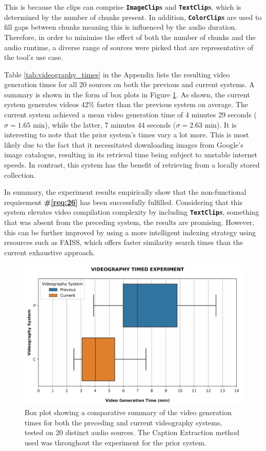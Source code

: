 \documentclass{l4proj}
\begin{document}
This is because the clips can comprise \textbf{\lstinline|ImageClip|s} and \textbf{\lstinline|TextClip|s}, which is determined by the number of chunks present. In addition, \textbf{\lstinline|ColorClip|s} are used to fill gaps between chunks meaning this is influenced by the audio duration. Therefore, in order to minimise the effect of both the number of chunks and the audio runtime, a diverse range of sources were picked that are representative of the tool's use case. 

Table \ref{tab:videography_times} in the Appendix lists the resulting video generation times for all 20 sources on both the previous and current systems. A summary is shown in the form of box plots in Figure \ref{fig:videography_timed}. As shown, the current system generates videos
42\% faster than the previous system on average. The current system achieved a mean video generation time of 4 minutes 29 seconds ($\sigma = 1.65$ min), while the latter, 7 minutes 44 seconds ($\sigma = 2.63$ min). It is interesting to note that the prior system's times vary a lot more. This is most likely due to the fact that it necessitated downloading images from Google's image catalogue, resulting in its retrieval time being subject to unstable internet speeds. In contrast, this system has the benefit of retrieving from a locally stored collection.

In summary, the experiment results empirically show that the non-functional requirement \textbf{\#\ref{req:26}} has been successfully fulfilled. Considering that this system elevates video compilation complexity by including \textbf{\lstinline|TextClip|s}, something that was absent from the preceding system, the results are promising. However, this can be further improved by using a more intelligent indexing strategy using resources such as FAISS, which offers faster similarity search times than the current exhaustive approach.

\begin{figure}
    \centering
    \includegraphics[width=1\textwidth]{figures/videography_timed_experiment.pdf}
    \caption{Box plot showing a comparative summary of the video generation times for both the preceding and current videography systems, tested on 20 distinct audio sources. The Caption Extraction method used was throughout the experiment for the prior system.}
    \label{fig:videography_timed}
\end{figure}
\end{document}
